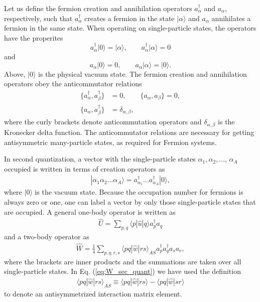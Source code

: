 \documentclass[a4paper,12pt]{report}
\begin{document}
Let us define the fermion creation and annihilation operators $a_{\alpha }^{\dagger }$ and $a_{\alpha }$, respectively, such that $a_{\alpha }^{\dagger }$ creates a fermion in the state $| \alpha \rangle $ and $a_{\alpha }$ annihilates a fermion in the same state. When operating on single-particle states, the operators have the properites
\begin{equation}
  a_{\alpha }^{\dagger }|0\rangle = |\alpha \rangle , \qquad a_{\alpha }^{\dagger }|\alpha \rangle = 0  
\end{equation}
and
\begin{equation}
  a_{\alpha }|0\rangle = 0, \qquad a_{\alpha }|\alpha \rangle = |0\rangle .
\end{equation}
Above, $|0\rangle $ is the physical vacuum state. The fermion creation and annihilation operators obey the anticommutator relations
\begin{align}
  \{ a_{\alpha }^{\dagger }, a_{\beta }^{\dagger }\} &= 0, \qquad \{ a_{\alpha }, a_{\beta }\} = 0, \nonumber \\
  \{ a_{\alpha }, a_{\beta }^{\dagger } \} &= \delta_{\alpha , \beta }, 
\end{align}
where the curly brackets denote anticommutation operators and $\delta_{\alpha , \beta }$ is the Kronecker delta function. The anticommutator relations are necessary for getting antisymmetric many-particle states, as required for Fermion systems. 

In second quantization, a vector with the single-particle states $\alpha_{1}, \alpha_{2}, \dots $, $\alpha_{A}$ occupied is written in terms of creation operators as
\begin{align}
  | \alpha_{1}\alpha_{2}\dots \alpha_{A}\rangle = a_{\alpha_{1}}^{\dagger }\dots a_{\alpha_{A}}^{\dagger }| 0\rangle ,
\end{align}
where $| 0\rangle $ is the vacuum state. Because the occupation number for fermions is always zero or one, one can label a vector by only those single-particle
states that are occupied. A general one-body operator is written as
\begin{align}
  \hat{U} = \sum_{p,q}\langle p|\hat{u}|q\rangle a_{p}^{\dagger }a_{q}
\end{align}
and a two-body operator as
\begin{align}
  \hat{W} = \frac{1}{4}\sum_{p,q,r,s}\langle pq|\hat{w}|rs\rangle_{AS}a_{p}^{\dagger }a_{q}^{\dagger}a_{s}a_{r},
  \label{eq:W_sec_quant}
\end{align}
where the brackets are inner products and the summations are taken over all single-particle states. In Eq. (\ref{eq:W_sec_quant}) we have used the definition
\begin{align}
  \langle pq|\hat{w}|rs\rangle_{AS} \equiv \langle pq|\hat{w}|rs\rangle - \langle pq|\hat{w}|sr\rangle
\end{align}
 to denote an antisymmetrized interaction matrix element.
\end{document}
